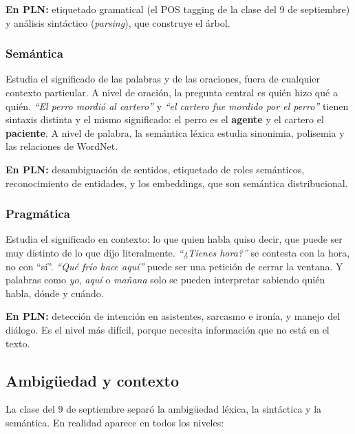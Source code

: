\documentclass[11pt,letterpaper]{article}
\begin{document}
\textbf{En PLN:} etiquetado gramatical (el POS tagging de la clase del
$9$ de septiembre) y análisis sintáctico (\textit{parsing}), que
construye el árbol.

\subsubsection*{Semántica}

Estudia el significado de las palabras y de las oraciones, fuera de
cualquier contexto particular. A nivel de oración, la pregunta central
es quién hizo qué a quién. \textit{``El perro mordió al cartero''} y
\textit{``el cartero fue mordido por el perro''} tienen sintaxis
distinta y el mismo significado: el perro es el \textbf{agente} y el
cartero el \textbf{paciente}. A nivel de palabra, la semántica léxica
estudia sinonimia, polisemia y las relaciones de WordNet.

\textbf{En PLN:} desambiguación de sentidos, etiquetado de roles
semánticos, reconocimiento de entidades, y los embeddings, que son
semántica distribucional.

\subsubsection*{Pragmática}

Estudia el significado en contexto: lo que quien habla quiso decir, que
puede ser muy distinto de lo que dijo literalmente.
\textit{``¿Tienes hora?''} se contesta con la hora, no con ``sí''.
\textit{``Qué frío hace aquí''} puede ser una petición de cerrar la
ventana. Y palabras como \textit{yo}, \textit{aquí} o
\textit{mañana} solo se pueden interpretar sabiendo quién habla,
dónde y cuándo.

\textbf{En PLN:} detección de intención en asistentes, sarcasmo e
ironía, y manejo del diálogo. Es el nivel más difícil, porque necesita
información que no está en el texto.


\subsection*{Ambigüedad y contexto}

La clase del $9$ de septiembre separó la ambigüedad léxica, la
sintáctica y la semántica. En realidad aparece en todos los niveles:
\end{document}
